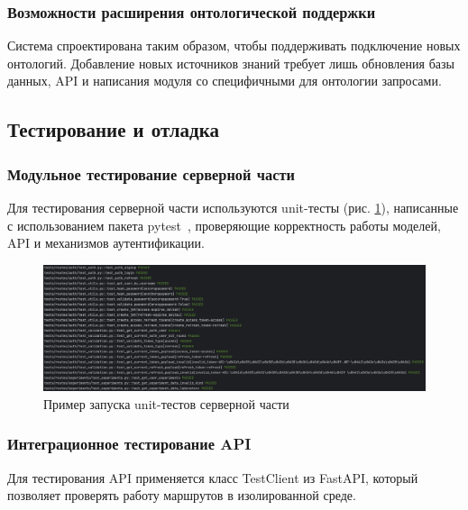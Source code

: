 \subsubsection{Возможности расширения онтологической поддержки}

Система спроектирована таким образом, чтобы поддерживать подключение новых онтологий. Добавление новых источников знаний требует лишь обновления базы данных, API и написания модуля со специфичными для онтологии запросами.


\subsection{Тестирование и отладка}

\subsubsection{Модульное тестирование серверной части}

Для тестирования серверной части используются unit-тесты (рис. \ref{pic:backend_unit_tests}), написанные с использованием пакета pytest~\cite{Library:Pytest}, проверяющие корректность работы моделей, API и механизмов аутентификации.

\begin{figure}[H]
    \centering
    \includegraphics[width=\linewidth]{img/python_unit_tests.png}
    \caption{Пример запуска unit-тестов серверной части}
    \label{pic:backend_unit_tests}
\end{figure}
\vspace{0.5cm}

\subsubsection{Интеграционное тестирование API}

Для тестирования API применяется класс TestClient из FastAPI, который позволяет проверять работу маршрутов в изолированной среде.


